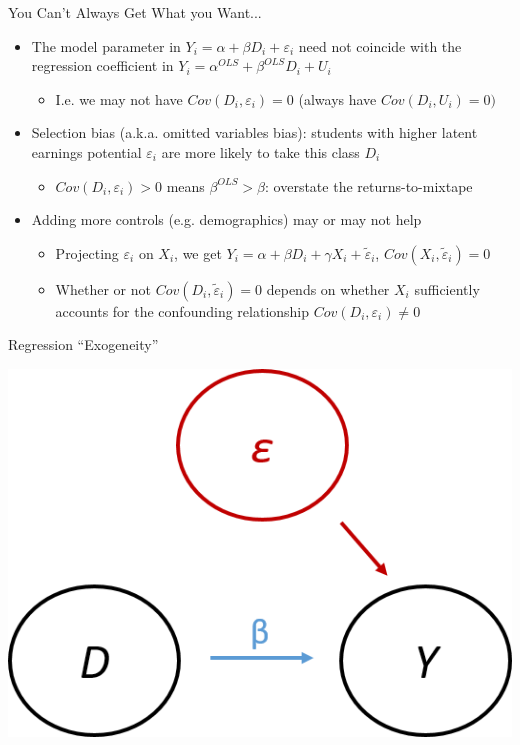 \documentclass{beamer}
\begin{document}
\begin{frame}{You Can't Always Get What you Want...}
\begin{itemize}
\item The model parameter in $Y_i=\alpha+\beta D_i+\varepsilon_i$ need not coincide with the regression coefficient in $Y_i=\alpha^{OLS}+\beta^{OLS} D_i+U_i$\smallskip
\begin{itemize}
\item I.e. we may not have $Cov(D_i,\varepsilon_i)=0$ (always have $Cov(D_i,U_i)=0)$
\end{itemize}\bigskip\pause{}
\item Selection bias (a.k.a. omitted variables bias): students with higher latent earnings potential $\varepsilon_i$ are more likely to take this class $D_i$\smallskip
\begin{itemize}
\item $Cov(D_i,\varepsilon_i)>0$ means $\beta^{OLS}>\beta$: overstate the returns-to-mixtape
\end{itemize}\bigskip\pause{}
\item Adding more controls (e.g. demographics) may or may not help\smallskip
\begin{itemize}
\item Projecting $\varepsilon_i$ on $X_i$, we get $Y_i=\alpha+\beta D_i+\gamma X_i+\tilde\varepsilon_i$, $Cov(X_i,\tilde\varepsilon_i)=0$\smallskip
\item Whether or not $Cov(D_i,\tilde\varepsilon_i)=0$ depends on whether $X_i$ sufficiently accounts for the confounding relationship $Cov(D_i,\varepsilon_i)\neq 0$
\end{itemize}
\end{itemize}
\end{frame}

\begin{frame}{Regression ``Exogeneity''}

\begin{center}
\includegraphics[scale=0.8]{./lecture_includes/dag1.png}
\end{center}

\end{frame}
\end{document}
